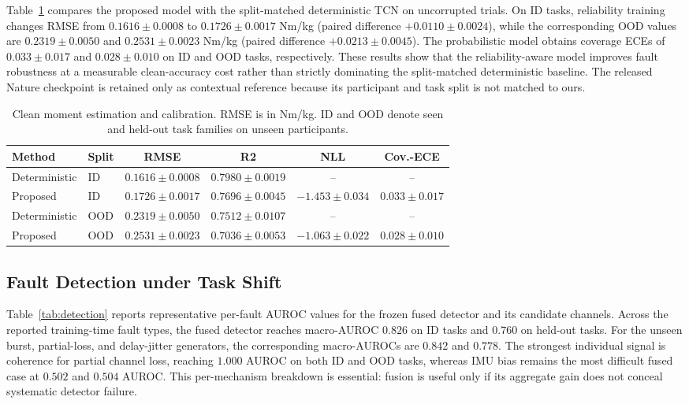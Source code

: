 \documentclass[letterpaper]{article} %
\begin{document}
Table~\ref{tab:accuracy} compares the proposed model with the split-matched deterministic TCN on uncorrupted trials.
On ID tasks, reliability training changes RMSE from $0.1616\pm0.0008$ to $0.1726\pm0.0017$ Nm/kg (paired difference $+0.0110\pm0.0024$), while the corresponding OOD values are $0.2319\pm0.0050$ and $0.2531\pm0.0023$ Nm/kg (paired difference $+0.0213\pm0.0045$).
The probabilistic model obtains coverage ECEs of $0.033\pm0.017$ and $0.028\pm0.010$ on ID and OOD tasks, respectively.
These results show that the reliability-aware model improves fault robustness at a measurable clean-accuracy cost rather than strictly dominating the split-matched deterministic baseline.
The released Nature checkpoint is retained only as contextual reference because its participant and task split is not matched to ours.

\begin{table}[t]
\centering
\scriptsize
\setlength{\tabcolsep}{3.5pt}
\begin{tabular}{llcccc}
\toprule
Method & Split & RMSE & R2 & NLL & Cov.-ECE\\
\midrule
Deterministic & ID  & $0.1616\pm0.0008$ & $0.7980\pm0.0019$ & -- & --\\
Proposed      & ID  & $0.1726\pm0.0017$ & $0.7696\pm0.0045$ & $-1.453\pm0.034$ & $0.033\pm0.017$\\
Deterministic & OOD & $0.2319\pm0.0050$ & $0.7512\pm0.0107$ & -- & --\\
Proposed      & OOD & $0.2531\pm0.0023$ & $0.7036\pm0.0053$ & $-1.063\pm0.022$ & $0.028\pm0.010$\\
\bottomrule
\end{tabular}
\caption{Clean moment estimation and calibration. RMSE is in Nm/kg. ID and OOD denote seen and held-out task families on unseen participants.}
\label{tab:accuracy}
\end{table}

\subsection{Fault Detection under Task Shift}

Table~\ref{tab:detection} reports representative per-fault AUROC values for the frozen fused detector and its candidate channels.
Across the reported training-time fault types, the fused detector reaches macro-AUROC $0.826$ on ID tasks and $0.760$ on held-out tasks.
For the unseen burst, partial-loss, and delay-jitter generators, the corresponding macro-AUROCs are $0.842$ and $0.778$.
The strongest individual signal is coherence for partial channel loss, reaching $1.000$ AUROC on both ID and OOD tasks, whereas IMU bias remains the most difficult fused case at $0.502$ and $0.504$ AUROC.
This per-mechanism breakdown is essential: fusion is useful only if its aggregate gain does not conceal systematic detector failure.
\end{document}
